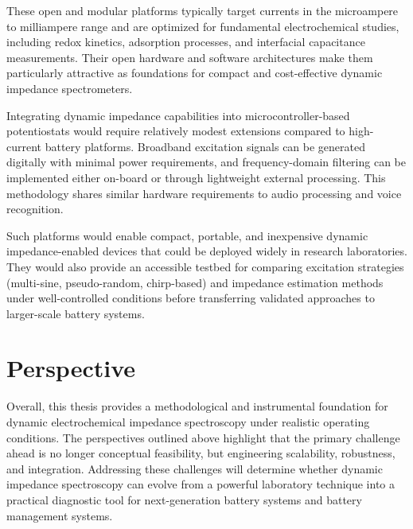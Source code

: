 These open and modular platforms typically target currents in the microampere to milliampere range and are optimized for fundamental electrochemical studies, including redox kinetics, adsorption processes, and interfacial capacitance measurements. Their open hardware and software architectures make them particularly attractive as foundations for compact and cost-effective dynamic impedance spectrometers.

Integrating dynamic impedance capabilities into microcontroller-based potentiostats would require relatively modest extensions compared to high-current battery platforms. Broadband excitation signals can be generated digitally with minimal power requirements, and frequency-domain filtering can be implemented either on-board or through lightweight external processing.
This methodology shares similar hardware requirements to audio processing and voice recognition.

Such platforms would enable compact, portable, and inexpensive dynamic impedance-enabled devices that could be deployed widely in research laboratories. They would also provide an accessible testbed for comparing excitation strategies (multi-sine, pseudo-random, chirp-based) and impedance estimation methods under well-controlled conditions before transferring validated approaches to larger-scale battery systems.

\section{Perspective}

Overall, this thesis provides a methodological and instrumental foundation for dynamic electrochemical impedance spectroscopy under realistic operating conditions. The perspectives outlined above highlight that the primary challenge ahead is no longer conceptual feasibility, but engineering scalability, robustness, and integration. Addressing these challenges will determine whether dynamic impedance spectroscopy can evolve from a powerful laboratory technique into a practical diagnostic tool for next-generation battery systems and battery management systems.